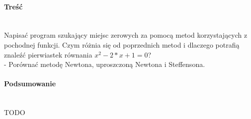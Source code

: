 \paragraph{Treść}~\\
Napisać program szukający miejsc zerowych za pomocą metod korzystających z pochodnej funkcji. Czym różnia się od poprzednich metod i dlaczego potrafią znaleźć pierwiastek równania $ x^2 - 2*x + 1 = 0 $?\\
- Porównać metodę Newtona, uproszczoną Newtona i Steffensona.\\

\paragraph{Podsumowanie}~\\
TODO
